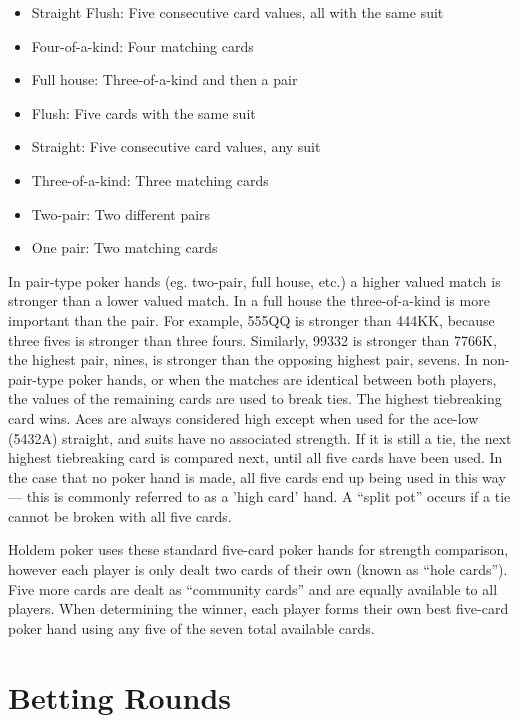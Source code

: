 \begin{itemize}
\singlespacing
\item Straight Flush: Five consecutive card values, all with the same suit
\item Four-of-a-kind: Four matching cards
\item Full house: Three-of-a-kind and then a pair
\item Flush: Five cards with the same suit
\item Straight: Five consecutive card values, any suit
\item Three-of-a-kind: Three matching cards
\item Two-pair: Two different pairs
\item One pair: Two matching cards
\end{itemize}
In pair-type poker hands (eg. two-pair, full house, etc.) a higher valued match is stronger than a lower valued match.
In a full house the three-of-a-kind is more important than the pair.
For example, 555QQ is stronger than 444KK, because three fives is stronger than three fours.
Similarly, 99332 is stronger than 7766K, the highest pair, nines, is stronger than the opposing highest pair, sevens.
In non-pair-type poker hands, or when the matches are identical between both players, the values of the remaining cards are used to break ties.
The highest tiebreaking card wins.
Aces are always considered high except when used for the ace-low (5432A) straight, and suits have no associated strength.
If it is still a tie, the next highest tiebreaking card is compared next, until all five cards have been used.
In the case that no poker hand is made, all five cards end up being used in this way --- this is commonly referred to as a 'high card' hand.
A ``split pot'' occurs if a tie cannot be broken with all five cards.

Holdem poker uses these standard five-card poker hands for strength comparison, however each player is only dealt two cards of their own (known as ``hole cards'').
Five more cards are dealt as ``community cards'' and are equally available to all players.
When determining the winner, each player forms their own best five-card poker hand using any five of the seven total available cards.


\section{Betting Rounds}
\label{sec:BettingRounds}

